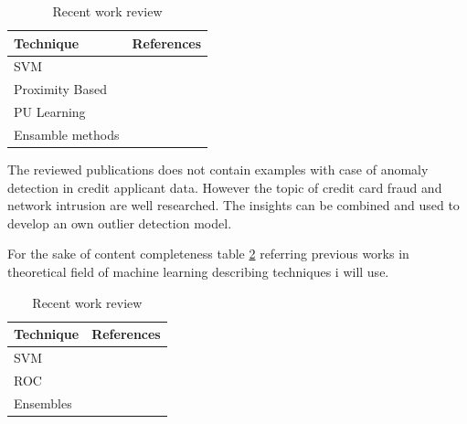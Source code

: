 \begin{table}
  \begin{center}
    \caption{Recent work review}
    \label{tab:recentwork}
    \begin{tabular}{l|l}
    Technique & References \\
      \hline
     SVM & \cite{Eskin:2010,Chandola:2009:ADS:1541880.1541882,Hinneburg:2000:NNH:645926.671675,Aggarwal:1999:FAP:304181.304188,Ahmed:2015,Claesen:2014} \\
     \hline
     Proximity Based & \cite{Chandola:2009:ADS:1541880.1541882,Hinneburg:2000:NNH:645926.671675,Aggarwal:1999:FAP:304181.304188,Ahmed:2015} \\
     \hline
     PU Learning & \cite{Li:2011, Claesen:2014} \\
     \hline
     Ensamble methods & \cite{Peddabachigari:2007, Bukhtoyarov:2014, Kavitha:2015, Claesen:2014} \\
     \hline
    \end{tabular}
  \end{center}
\end{table}

The reviewed publications does not contain examples with case of anomaly detection in credit applicant data. However the topic of credit card fraud \cite{Eskin:2010,Chandola:2009:ADS:1541880.1541882,Hinneburg:2000:NNH:645926.671675,Aggarwal:1999:FAP:304181.304188,Ahmed:2015} and network intrusion \cite{Peddabachigari:2007,Kavitha:2015,Eskin:2010,Chandola:2009:ADS:1541880.1541882,Hinneburg:2000:NNH:645926.671675,Aggarwal:1999:FAP:304181.304188,Ahmed:2015} are well researched. The insights can be combined and used to develop an own outlier detection model.

For the sake of content completeness table \ref{tab:recentworkbase} referring previous works in theoretical field of machine learning describing techniques i will use.

\begin{table}[h!]
  \begin{center}
    \caption{Recent work review}
    \label{tab:recentworkbase}
    \begin{tabular}{l|r}
    Technique & References \\
      \hline
     SVM & \cite{Tax:2004:SVD:960091.960109} \\
     \hline
     ROC & \cite{Fawcett:2006:IRA:1159473.1159475} \\
     \hline
     Ensembles & \cite{Nikunj:2009,Caruana:2004:ESL:1015330.1015432} \\
     \hline
    \end{tabular}
  \end{center}
\end{table}



